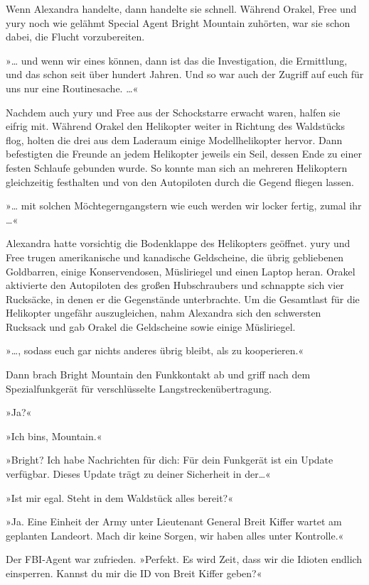 Wenn Alexandra handelte, dann handelte sie schnell. Während Orakel, Free und yury noch wie gelähmt Special Agent Bright Mountain zuhörten, war sie schon dabei, die Flucht vorzubereiten.

»… und wenn wir eines können, dann ist das die Investigation, die Ermittlung, und das schon seit über hundert Jahren. Und so war auch der Zugriff auf euch für uns nur eine Routinesache. …«

Nachdem auch yury und Free aus der Schockstarre erwacht waren, halfen sie eifrig mit. Während Orakel den Helikopter weiter in Richtung des Waldstücks flog, holten die drei aus dem Laderaum einige Modellhelikopter hervor. Dann befestigten die Freunde an jedem Helikopter jeweils ein Seil, dessen Ende zu einer festen Schlaufe gebunden wurde. So konnte man sich an mehreren Helikoptern gleichzeitig festhalten und von den Autopiloten durch die Gegend fliegen lassen.

»… mit solchen Möchtegerngangstern wie euch werden wir locker fertig, zumal ihr …«

Alexandra hatte vorsichtig die Bodenklappe des Helikopters geöffnet. yury und Free trugen amerikanische und kanadische Geldscheine, die übrig gebliebenen Goldbarren, einige Konservendosen, Müsliriegel und einen Laptop heran. Orakel aktivierte den Autopiloten des großen Hubschraubers und schnappte sich vier Rucksäcke, in denen er die Gegenstände unterbrachte. Um die Gesamtlast für die Helikopter ungefähr auszugleichen, nahm Alexandra sich den schwersten Rucksack und gab Orakel die Geldscheine sowie einige Müsliriegel.

»…, sodass euch gar nichts anderes übrig bleibt, als zu kooperieren.«

Dann brach Bright Mountain den Funkkontakt ab und griff nach dem Spezialfunkgerät für verschlüsselte Langstreckenübertragung.

»Ja?«

»Ich bins, Mountain.«

»Bright? Ich habe Nachrichten für dich: Für dein Funkgerät ist ein Update verfügbar. Dieses Update trägt zu deiner Sicherheit in der…«

»Ist mir egal. Steht in dem Waldstück alles bereit?«

»Ja. Eine Einheit der Army unter Lieutenant General Breit Kiffer wartet am geplanten Landeort. Mach dir keine Sorgen, wir haben alles unter Kontrolle.«

Der FBI-Agent war zufrieden. »Perfekt. Es wird Zeit, dass wir die Idioten endlich einsperren. Kannst du mir die ID von Breit Kiffer geben?«

